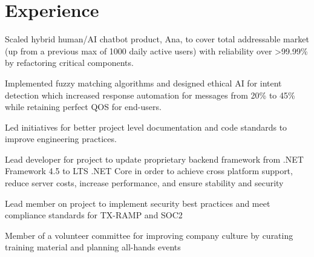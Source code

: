 \documentclass[no-math]{deedy-resume-openfont}
\begin{document}
	\hfill
	\begin{minipage}[t]{0.66\textwidth} 
		
		\section{Experience}
		
		\vspace{\topsep} %
		\begin{tightemize}
			\item Scaled hybrid human/AI chatbot product, Ana, to cover total addressable market  (up from a previous max of 1000 daily active users) with reliability over >99.99\% by refactoring critical components.
			\item Implemented fuzzy matching algorithms and designed ethical AI for intent detection
			 which increased response automation for messages from 20\% to 45\% while retaining perfect QOS for end-users.
			\item Led initiatives for better project level documentation and code standards to improve engineering practices. 
			\item Lead developer for project to update proprietary backend framework from .NET Framework 4.5 to LTS .NET Core in order to achieve cross platform support, reduce server costs, increase performance, and ensure stability and security
			\item Lead member on project to implement security best practices and meet compliance standards for TX-RAMP and SOC2 
			\item Member of a volunteer committee for improving company culture by curating training material and planning all-hands events
		\end{tightemize}
		\sectionsep
		

\end{minipage}
\end{document}
